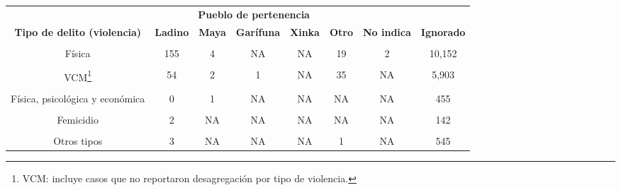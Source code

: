 \begin{tabular}[t]{cccccccc}
\toprule
\multicolumn{1}{c}{\textbf{ }} & \multicolumn{5}{c}{\textbf{Pueblo de pertenencia}} & \multicolumn{1}{c}{\textbf{ }} \\
\cmidrule(l{3pt}r{3pt}){2-6}
\textbf{Tipo de delito (violencia)} & \textbf{Ladino} & \textbf{Maya} & \textbf{Garífuna} & \textbf{Xinka} & \textbf{Otro} & \textbf{No indica} & \textbf{Ignorado}\\
\midrule
\cellcolor[HTML]{A8A4FB}{Psicológica} & \cellcolor[HTML]{A8A4FB}{32} & \cellcolor[HTML]{A8A4FB}{2} & \cellcolor[HTML]{A8A4FB}{NA} & \cellcolor[HTML]{A8A4FB}{NA} & \cellcolor[HTML]{A8A4FB}{5} & \cellcolor[HTML]{A8A4FB}{NA} & \cellcolor[HTML]{A8A4FB}{17,408}\\
Física & 155 & 4 & NA & NA & 19 & 2 & 10,152\\
\cellcolor[HTML]{A8A4FB}{Física y psicológica} & \cellcolor[HTML]{A8A4FB}{20} & \cellcolor[HTML]{A8A4FB}{NA} & \cellcolor[HTML]{A8A4FB}{NA} & \cellcolor[HTML]{A8A4FB}{NA} & \cellcolor[HTML]{A8A4FB}{NA} & \cellcolor[HTML]{A8A4FB}{NA} & \cellcolor[HTML]{A8A4FB}{9,558}\\
VCM\footnote{VCM: incluye casos que no reportaron desagregación por tipo de violencia.} & 54 & 2 & 1 & NA & 35 & NA & 5,903\\
\cellcolor[HTML]{A8A4FB}{Psicológica y económica} & \cellcolor[HTML]{A8A4FB}{2} & \cellcolor[HTML]{A8A4FB}{NA} & \cellcolor[HTML]{A8A4FB}{NA} & \cellcolor[HTML]{A8A4FB}{NA} & \cellcolor[HTML]{A8A4FB}{NA} & \cellcolor[HTML]{A8A4FB}{NA} & \cellcolor[HTML]{A8A4FB}{603}\\
Física, psicológica y económica & 0 & 1 & NA & NA & NA & NA & 455\\
\cellcolor[HTML]{A8A4FB}{VCM y económica} & \cellcolor[HTML]{A8A4FB}{2} & \cellcolor[HTML]{A8A4FB}{NA} & \cellcolor[HTML]{A8A4FB}{NA} & \cellcolor[HTML]{A8A4FB}{NA} & \cellcolor[HTML]{A8A4FB}{1} & \cellcolor[HTML]{A8A4FB}{NA} & \cellcolor[HTML]{A8A4FB}{331}\\
Femicidio & 2 & NA & NA & NA & NA & NA & 142\\
\cellcolor[HTML]{A8A4FB}{Física y económica} & \cellcolor[HTML]{A8A4FB}{0} & \cellcolor[HTML]{A8A4FB}{NA} & \cellcolor[HTML]{A8A4FB}{NA} & \cellcolor[HTML]{A8A4FB}{NA} & \cellcolor[HTML]{A8A4FB}{NA} & \cellcolor[HTML]{A8A4FB}{NA} & \cellcolor[HTML]{A8A4FB}{120}\\
Otros tipos & 3 & NA & NA & NA & 1 & NA & 545\\
\bottomrule
\end{tabular}
